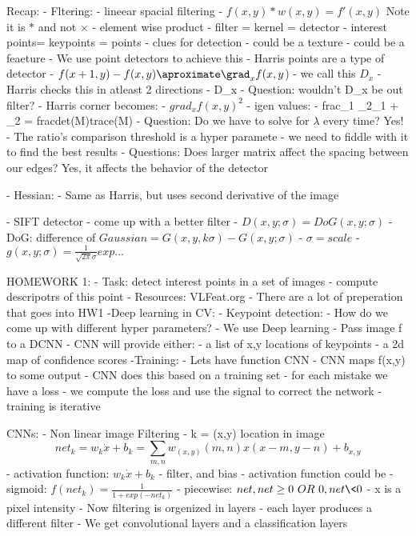 Recap:
- Fltering: 
 - lineear spacial filtering
 - $f(x,y) * w(x,y) = f'(x,y)$ Note it is $*$ and not $\times$
  - element wise product
  - filter = kernel = detector
- interest points= keypoints = points
 - clues for detection
 - could be a texture
 - could be a feaeture
- We use point detectors to achieve this
 - Harris points are a type of detector
  - $f(x+1,y) - f(x,y) \aproximate \grad_x f(x,y$)
  - we call this $D_x$
  - Harris checks this in atleast 2 directions
  - D_x
  - Question: wouldn't D_x be out filter?
  - Harris corner becomes:
   - $grad_x f(x,y)^2$
   - igen values:
    - frac{\lambda_1 \lambda_2}{\lambda_1 + \lambda_2} = frac{det(M)}{trace(M)}
  - Question: Do we have to  solve for $\lambda$ every time? Yes!
  - The ratio's comparison threshold is a hyper paramete
  - we need to fiddle with it to find the best results
 - Questions: Does larger matrix affect the spacing between our edges? Yes, it affects the behavior of the detector

- Hessian:
 - Same as Harris, but uses second derivative of the image

- SIFT detector
 - come up with a better filter
 - $D(x,y;\sigma) = DoG(x,y;\sigma)$
  - DoG: difference of $Gaussian = G(x,y,k\sigma) - G(x,y; \sigma)$
  - $\sigma = scale$
  - $g(x,y;\sigma) = \frac{1}{\sqrt{2\pi}\sigma} exp ...$

HOMEWORK 1:
- Task: detect interest points in a set of images
- compute descripotrs of this point
- Resources: VLFeat.org
- There are a lot of preperation that goes into HW1
-Deep learning in CV:
 - Keypoint detection:
  - How do we come up with different hyper parameters?
   - We use Deep learning
  - Pass image f to a DCNN
  - CNN will provide either: 
   - a list of x,y locations of keypoints
   - a 2d map of confidence scores
-Training:
 - Lets have function CNN
 - CNN maps f(x,y) to some output
 - CNN does this based on a training set
 - for each mistake we have a loss
 - we compute the loss and use the signal to correct the network
 - training is iterative

CNNs:
- Non linear image Filtering
- k = (x,y) location in image
\[net_k = w_k \dot x + b_k = \sum_{m,n}w_{(x,y)}(m,n)x(x - m, y - n) + b_{x,y}\]
- activation function: $w_k \dot x + b_k$
 - filter, and bias
- activation function could be
 - sigmoid: $f(net_k) = \frac{1}{1 + exp(-net_k)}$
 - piecewise: $net, net \geq 0\ OR\ 0, net \< 0$
 - x is a pixel intensity
- Now filtering is orgenized in layers
 - each layer produces a different filter
- We get convolutional layers and a classification layers
